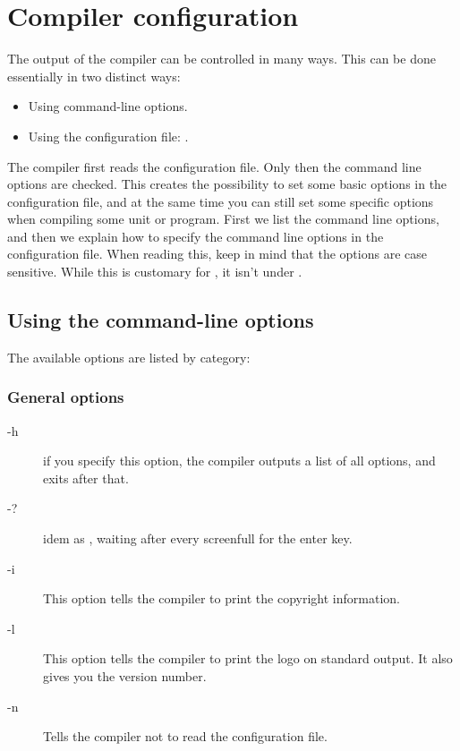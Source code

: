 \documentclass{report}
\newcommand{\olabel}[1]{\label{option:#1}}
\begin{document}
\chapter{Compiler configuration}
\label{ch:CompilerConfiguration}

The output of the compiler can be controlled in many ways. This can be done
essentially in two distinct ways:
\begin{itemize}
\item Using command-line options.
\item Using the configuration file: .
\end{itemize}
The compiler first reads the configuration file. Only then the command line
options are checked. This creates the possibility to set some basic options
in the configuration file, and at the same time you can still set some
specific options when compiling some unit or program. First we list the
command line options, and then we explain how to specify the command
line options in the configuration file. When reading this, keep in mind
that the options are case sensitive. While this is customary for \linux, it
isn't under \dos.
  

\section{Using the command-line options}

The available options are listed by category:

%
%

\subsection{General options}
\begin{description}
\item[-h] if you specify this option, the compiler outputs a list of all options, 
and exits after that.
\olabel{h}
\item[-?] idem as , waiting after every screenfull for the enter key.
\item[-i] This option tells the compiler to print the copyright information.
\olabel{i}
\item[-l] This option tells the compiler to print the \fpc logo on standard
output. It also gives you the \fpc version number.
\olabel{l}
\item [-n] Tells the compiler not to read the configuration file.
\olabel{n}
\end{description}
\end{document}
